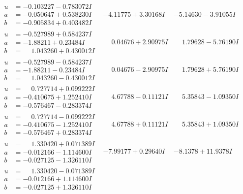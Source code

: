 \documentclass[1p]{elsarticle_modified}
\theoremstyle{definition}
\begin{document}
$$\begin{array}{c|c|c}
\begin{aligned}
u &= -0.103227 - 0.783072 I \\
a &= -0.050647 + 0.538230 I \\
b &= -0.905834 + 0.403482 I\end{aligned}
 & -4.11775 + 3.30168 I & -5.14630 - 3.91055 I \\ \hline\begin{aligned}
u &= -0.527989 + 0.584237 I \\
a &= -1.88211 + 0.23484 I \\
b &= \phantom{-}1.043260 + 0.430012 I\end{aligned}
 & \phantom{-}0.04676 + 2.90975 I & \phantom{-}1.79628 - 5.76190 I \\ \hline\begin{aligned}
u &= -0.527989 - 0.584237 I \\
a &= -1.88211 - 0.23484 I \\
b &= \phantom{-}1.043260 - 0.430012 I\end{aligned}
 & \phantom{-}0.04676 - 2.90975 I & \phantom{-}1.79628 + 5.76190 I \\ \hline\begin{aligned}
u &= \phantom{-}0.727714 + 0.099222 I \\
a &= -0.410675 + 1.252410 I \\
b &= -0.576467 - 0.283374 I\end{aligned}
 & \phantom{-}4.67788 - 0.11121 I & \phantom{-}5.35843 - 1.09350 I \\ \hline\begin{aligned}
u &= \phantom{-}0.727714 - 0.099222 I \\
a &= -0.410675 - 1.252410 I \\
b &= -0.576467 + 0.283374 I\end{aligned}
 & \phantom{-}4.67788 + 0.11121 I & \phantom{-}5.35843 + 1.09350 I \\ \hline\begin{aligned}
u &= \phantom{-}1.330420 + 0.071389 I \\
a &= -0.012166 - 1.114600 I \\
b &= -0.027125 - 1.326110 I\end{aligned}
 & -7.99177 + 0.29640 I & -8.1378 + 11.9378 I \\ \hline\begin{aligned}
u &= \phantom{-}1.330420 - 0.071389 I \\
a &= -0.012166 + 1.114600 I \\
b &= -0.027125 + 1.326110 I\end{aligned}

\end{array}$$
\end{document}
